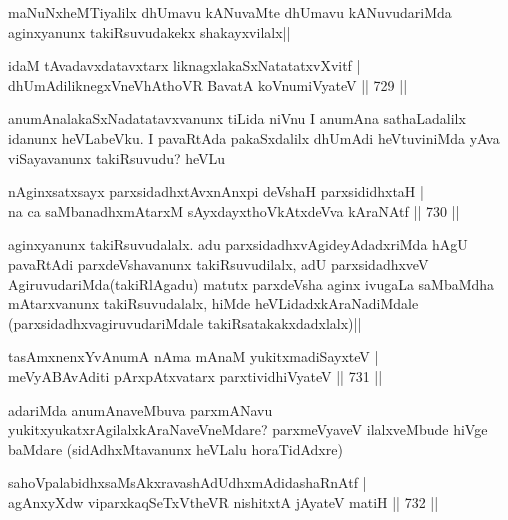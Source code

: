 \begin{artha}
maNuNxheMTiyalilx dhUmavu kANuvaMte dhUmavu kANuvudariMda aginxyanunx takiRsuvudakekx  shakayxvilalx||
\end{artha}

\begin{shl}
idaM tAvadavxdatavxtarx liknagxlakaSxNatatatxvXvitf | \\
dhUmAdiliknegxVneVhAthoVR BavatA koV\s numiVyateV \hfill||  729 ||  
\end{shl}

\begin{artha}
anumAnalakaSxNadatatavxvanunx tiLida niVnu  I anumAna sathaLadalilx idanunx heVLabeVku. I pavaRtAda pakaSxdalilx dhUmAdi heVtuviniMda yAva viSayavanunx takiRsuvudu? heVLu
\end{artha}

\begin{shl}
nAginxsatxsayx parxsidadhxtAvxnAnxpi deVshaH parxsididhxtaH | \\
na ca saMbanadhxmAtarxM sAyxdayxthoVkAtxdeVva kAraNAtf \hfill||  730 ||  
\end{shl}

\begin{artha}
aginxyanunx takiRsuvudalalx. adu parxsidadhxvAgideyAdadxriMda hAgU pavaRtAdi parxdeVshavanunx takiRsuvudilalx, adU parxsidadhxveV AgiruvudariMda(takiRlAgadu) matutx parxdeVsha aginx ivugaLa saMbaMdha mAtarxvanunx takiRsuvudalalx, hiMde heVLidadxkAraNadiMdale (parxsidadhxvagiruvudariMdale takiRsatakakxdadxlalx)||
\end{artha}


\begin{shl}
tasAmxnenxYvAnumA nAma mAnaM yukitxmadiSayxteV | \\
meVyABAvAditi pArxpAtxvatarx parxtividhiVyateV \hfill||  731 ||  
\end{shl}

\begin{artha}
adariMda anumAnaveMbuva parxmANavu yukitxyukatxrAgilalxkAraNaveVneMdare? parxmeVyaveV ilalxveMbude hiVge baMdare (sidAdhxMtavanunx heVLalu horaTidAdxre)
\end{artha}


\begin{shl}
sahoVpalabidhxsaMsAkxravashAdUdhxmAdidashaRnAtf | \\
agAnxyXdw viparxkaqSeTxV\s theVR nishitxtA jAyateV matiH \hfill||  732 ||  
\end{shl}


